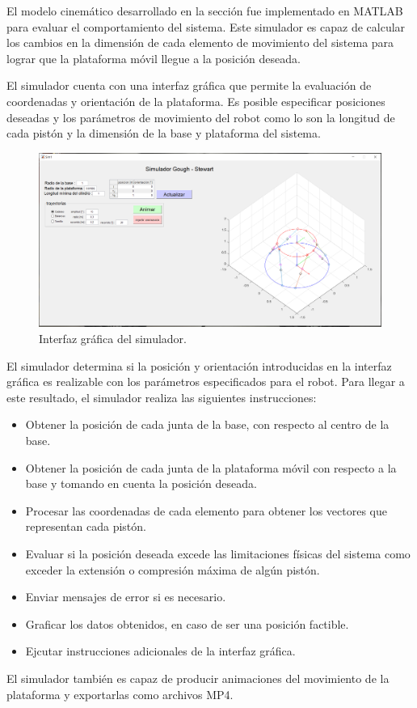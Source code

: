 El modelo cinemático desarrollado en la sección
 fue implementado en MATLAB
para evaluar el comportamiento del sistema.
Este simulador es capaz de calcular los cambios en 
la dimensión de cada elemento de movimiento del sistema
para lograr que la plataforma móvil 
llegue a la posición deseada.

El simulador cuenta con una interfaz gráfica que permite la 
evaluación de coordenadas y orientación de la plataforma.
Es posible especificar posiciones deseadas y 
los parámetros de movimiento del robot como lo son la
longitud de cada pistón y la dimensión de la base y 
plataforma del sistema.

\begin{figure}
 \centering
 \includegraphics[scale=0.2]{img/principal.png}
 \caption{Interfaz gráfica del simulador.}
 \label{fig: GUI}
\end{figure}


El simulador determina si la posición y 
orientación introducidas en la interfaz gráfica
es realizable con los parámetros especificados para
el robot. Para llegar a este resultado, el simulador realiza
las siguientes instrucciones:

\begin{itemize}
 \item Obtener la posición de cada junta de la base,
 con respecto al centro de la base.
 \item Obtener la posición de cada junta de la
 plataforma móvil con respecto a la base y tomando
 en cuenta la posición deseada.
 \item Procesar las coordenadas de cada elemento para 
 obtener los vectores que representan cada pistón.
 \item Evaluar si la posición deseada excede las 
 limitaciones físicas del sistema como exceder la 
 extensión o compresión máxima de algún pistón.
 \item Enviar mensajes de error si es necesario.
 \item Graficar los datos obtenidos, en caso de ser una
 posición factible.
 \item Ejcutar instrucciones adicionales 
 de la interfaz gráfica.
\end{itemize}

El simulador también es capaz de producir animaciones del 
movimiento de la plataforma y exportarlas como 
archivos MP4.
